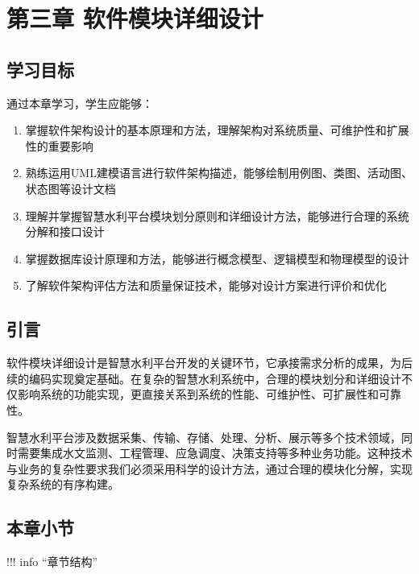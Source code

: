 \section{第三章 软件模块详细设计}\label{ux7b2cux4e09ux7ae0-ux8f6fux4ef6ux6a21ux5757ux8be6ux7ec6ux8bbeux8ba1}

\subsection{学习目标}\label{ux5b66ux4e60ux76eeux6807}

通过本章学习，学生应能够：

\begin{enumerate}
\def\labelenumi{\arabic{enumi}.}
\tightlist
\item
  掌握软件架构设计的基本原理和方法，理解架构对系统质量、可维护性和扩展性的重要影响
\item
  熟练运用UML建模语言进行软件架构描述，能够绘制用例图、类图、活动图、状态图等设计文档
\item
  理解并掌握智慧水利平台模块划分原则和详细设计方法，能够进行合理的系统分解和接口设计
\item
  掌握数据库设计原理和方法，能够进行概念模型、逻辑模型和物理模型的设计
\item
  了解软件架构评估方法和质量保证技术，能够对设计方案进行评价和优化
\end{enumerate}

\subsection{引言}\label{ux5f15ux8a00}

软件模块详细设计是智慧水利平台开发的关键环节，它承接需求分析的成果，为后续的编码实现奠定基础。在复杂的智慧水利系统中，合理的模块划分和详细设计不仅影响系统的功能实现，更直接关系到系统的性能、可维护性、可扩展性和可靠性。

智慧水利平台涉及数据采集、传输、存储、处理、分析、展示等多个技术领域，同时需要集成水文监测、工程管理、应急调度、决策支持等多种业务功能。这种技术与业务的复杂性要求我们必须采用科学的设计方法，通过合理的模块化分解，实现复杂系统的有序构建。

\subsection{本章小节}\label{ux672cux7ae0ux5c0fux8282}

!!! info ``章节结构''


